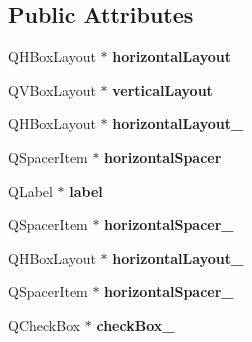 \subsection*{Public Attributes}
\begin{DoxyCompactItemize}
\item 
\hypertarget{class_ui__etat_right_afb2c5e015b19f481565920291e452b91}{Q\-H\-Box\-Layout $\ast$ {\bfseries horizontal\-Layout}}\label{class_ui__etat_right_afb2c5e015b19f481565920291e452b91}

\item 
\hypertarget{class_ui__etat_right_a36783f5e7f6f101dfa06ef6ccc7384a7}{Q\-V\-Box\-Layout $\ast$ {\bfseries vertical\-Layout}}\label{class_ui__etat_right_a36783f5e7f6f101dfa06ef6ccc7384a7}

\item 
\hypertarget{class_ui__etat_right_a0519086e59266c148a10fc0276d1de61}{Q\-H\-Box\-Layout $\ast$ {\bfseries horizontal\-Layout\-\_}}\label{class_ui__etat_right_a0519086e59266c148a10fc0276d1de61}

\item 
\hypertarget{class_ui__etat_right_a4b286b1151c99c60689fe086a4dbe97e}{Q\-Spacer\-Item $\ast$ {\bfseries horizontal\-Spacer}}\label{class_ui__etat_right_a4b286b1151c99c60689fe086a4dbe97e}

\item 
\hypertarget{class_ui__etat_right_a1d739dea7c4cfde35b1b6f4b8a05149c}{Q\-Label $\ast$ {\bfseries label}}\label{class_ui__etat_right_a1d739dea7c4cfde35b1b6f4b8a05149c}

\item 
\hypertarget{class_ui__etat_right_ac10b20a25fa8243c2d0188633a4cbfda}{Q\-Spacer\-Item $\ast$ {\bfseries horizontal\-Spacer\-\_}}\label{class_ui__etat_right_ac10b20a25fa8243c2d0188633a4cbfda}

\item 
\hypertarget{class_ui__etat_right_acaa14fa98a4eb35e90f4d7ffcc088876}{Q\-H\-Box\-Layout $\ast$ {\bfseries horizontal\-Layout\-\_}}\label{class_ui__etat_right_acaa14fa98a4eb35e90f4d7ffcc088876}

\item 
\hypertarget{class_ui__etat_right_aeb18dddd264265e8e551fcdb1957da7d}{Q\-Spacer\-Item $\ast$ {\bfseries horizontal\-Spacer\-\_}}\label{class_ui__etat_right_aeb18dddd264265e8e551fcdb1957da7d}

\item 
\hypertarget{class_ui__etat_right_ac833446768b5ac7f238b3b1160c4c088}{Q\-Check\-Box $\ast$ {\bfseries check\-Box\-\_}}\label{class_ui__etat_right_ac833446768b5ac7f238b3b1160c4c088}


\end{DoxyCompactItemize}
